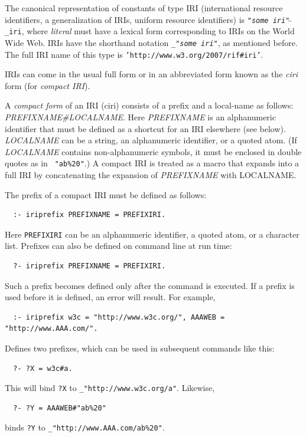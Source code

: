 \documentclass[11pt]{article}
\begin{document}
The canonical representation of constants of type IRI (international
resource identifiers, a generalization of IRIs, uniform resource
identifiers) is
{\tt "\emph{some iri}"$\hat{~}\hat{~}$\_iri}, where \emph{literal} must have
a lexical form corresponding to IRIs on the World Wide Web. IRIs have the shorthand notation
{\tt \_"\emph{some iri}"}, as mentioned before. The full IRI name of this
type is {\tt 'http://www.w3.org/2007/rif\#iri'}. 


IRIs can come in the usual full form or in an abbreviated form
known as the \emph{ciri} form (for \emph{compact IRI}).  

A \emph{compact form} of an IRI (ciri) consists of a
prefix and a local-name as follows: \emph{PREFIXNAME\#LOCALNAME}. Here
\emph{PREFIXNAME} is an alphanumeric identifier that must be defined as a
shortcut for an IRI elsewhere (see below). \emph{LOCALNAME} can be a string,
an alphanumeric identifier, or a quoted atom. (If \emph{LOCALNAME} contains
non-alphanumeric symbols, it must be enclosed in double quotes as in {\tt
  "ab\%20"}.) A compact IRI is treated as a macro that expands into a full IRI
by concatenating the expansion of \emph{PREFIXNAME}
with LOCALNAME.

The prefix of a compact IRI must be defined as follows:
\begin{verbatim}
  :- iriprefix PREFIXNAME = PREFIXIRI. 
\end{verbatim}
Here {\tt PREFIXIRI}  can be an alphanumeric identifier, a
quoted atom, or a character list. Prefixes can also be defined on
command line at run time:
\begin{verbatim}
  ?- iriprefix PREFIXNAME = PREFIXIRI. 
\end{verbatim}
Such a prefix becomes defined only after the command is executed.
If a prefix is used before it is defined, an error will result.
For example,
\begin{verbatim}
  :- iriprefix w3c = "http://www.w3c.org/", AAAWEB = "http://www.AAA.com/". 
\end{verbatim}
Defines two prefixes, which can be used in subsequent commands like this:
\begin{verbatim}
  ?- ?X = w3c#a.
\end{verbatim}
This will bind {\tt ?X} to   {\tt \_"http://www.w3c.org/a"}. 
Likewise,
\begin{verbatim}
  ?- ?Y = AAAWEB#"ab%20" 
\end{verbatim}
binds {\tt ?Y} to {\tt \_"http://www.AAA.com/ab\%20"}. 
\end{document}
